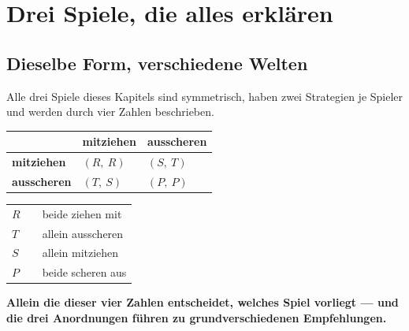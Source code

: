 \chapter{Drei Spiele, die alles erklären}

\section{Dieselbe Form, verschiedene Welten}

\begin{merksatz}
Alle drei Spiele dieses Kapitels sind symmetrisch, haben zwei Strategien je Spieler und werden durch vier Zahlen beschrieben.

\begin{center}
{\small
\renewcommand{\arraystretch}{1.6}
\begin{tabular}{@{}P{2.4cm}P{2.4cm}P{2.4cm}@{}}
\toprule
& \textbf{mitziehen} & \textbf{ausscheren}\\
\midrule
\textbf{mitziehen} & $(R,\ R)$ & $(S,\ T)$\\
\textbf{ausscheren} & $(T,\ S)$ & $(P,\ P)$\\
\bottomrule
\end{tabular}}
\end{center}

\begin{center}
{\small
\renewcommand{\arraystretch}{1.48}
\begin{tabular}{@{}P{1.4cm}P{3.0cm}P{3.6cm}@{}}
\toprule
$R$ &  & beide ziehen mit\\
$T$ &  & allein ausscheren\\
$S$ &  & allein mitziehen\\
$P$ &  & beide scheren aus\\
\bottomrule
\end{tabular}}
\end{center}

\begin{center}
\begin{minipage}{0.9\textwidth}
\textbf{Allein die  dieser vier Zahlen entscheidet, welches Spiel vorliegt --- und die drei Anordnungen führen zu grundverschiedenen Empfehlungen.}
\end{minipage}
\end{center}

\begin{center}
\begin{minipage}{0.88\textwidth}
\end{minipage}
\end{center}
\end{merksatz}

